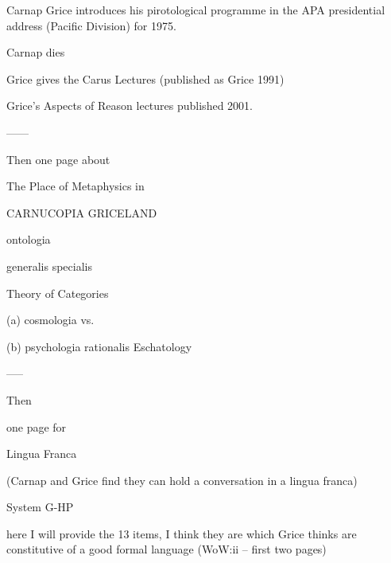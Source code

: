 \documentclass[10pt,titlepage]{book}
\begin{document}
 
   Carnap       
                                     Grice introduces his pirotological
                                      programme in the APA presidential
                                      address (Pacific Division) for 1975.
 
 
      Carnap dies
 
                                     Grice gives the Carus Lectures
                                           (published as Grice 1991)
 
                                    Grice's Aspects of Reason lectures
                                            published 2001.
 
 
 
------
 
 
Then one page about 
 
                The Place of Metaphysics in
 
 
CARNUCOPIA                                   GRICELAND
 
 
                                                       ontologia
 
 
                                       generalis                           
specialis
 
                                    Theory of Categories
 
                                                                            
   (a) cosmologia
                                             vs.
 
                                                                            
   (b) psychologia rationalis
                                     Eschatology
 
                    
         
 
-----
 
Then
 
                             one page for
 
 
 
                               Lingua Franca
 
               (Carnap and Grice find they can hold
               a conversation in a lingua franca)
 
                         System G-HP
 
                    here I will provide 
                   the 13 items, I think they are
                 which Grice thinks are constitutive
                    of a good formal language
                    (WoW:ii -- first two pages)
 
\end{document}

